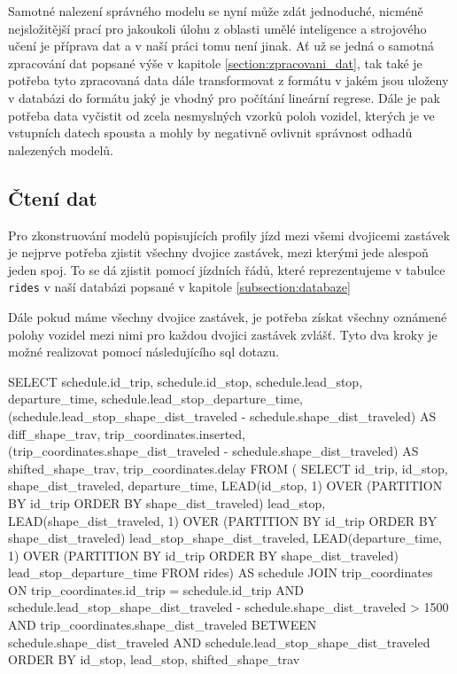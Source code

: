 Samotné nalezení správného modelu se nyní může zdát jednoduché, nicméně nejsložitější prací pro jakoukoli úlohu z oblasti umělé inteligence a strojového učení je příprava dat a v naší práci tomu není jinak. Ať už se jedná o samotná zpracování dat popsané výše v kapitole \ref{section:zpracovani_dat}, tak také je potřeba tyto zpracovaná data dále transformovat z formátu v jakém jsou uloženy v databázi do formátu jaký je vhodný pro počítání lineární regrese. Dále je pak potřeba data vyčistit od zcela nesmyslných vzorků poloh vozidel, kterých je ve vstupních datech spousta a mohly by negativně ovlivnit správnost odhadů nalezených modelů.


\subsection{Čtení dat} \label{subsection:cteni_dat}


Pro zkonstruování modelů popisujících profily jízd mezi všemi dvojicemi zastávek je nejprve potřeba zjistit všechny dvojice zastávek, mezi kterými jede alespoň jeden spoj. To se dá zjistit pomocí jízdních řádů, které reprezentujeme v tabulce \verb-rides- v naší databázi popsané v kapitole \ref{subsection:databaze}


\bigbreak


 Dále pokud máme všechny dvojice zastávek, je potřeba získat všechny oznámené polohy vozidel mezi nimi pro každou dvojici zastávek zvlášť. Tyto dva kroky je možné realizovat pomocí následujícího \gls{sql} dotazu.


\begin{code}[frame=none]
SELECT schedule.id_trip,
  schedule.id_stop,
  schedule.lead_stop,
  departure_time,
  schedule.lead_stop_departure_time,
  (schedule.lead_stop_shape_dist_traveled - schedule.shape_dist_traveled)
    AS diff_shape_trav,
  trip_coordinates.inserted,
  (trip_coordinates.shape_dist_traveled - schedule.shape_dist_traveled)
    AS shifted_shape_trav,
  trip_coordinates.delay
FROM (
  SELECT id_trip, id_stop, shape_dist_traveled, departure_time,
    LEAD(id_stop, 1) OVER (PARTITION BY
	  id_trip ORDER BY shape_dist_traveled) lead_stop,
    LEAD(shape_dist_traveled, 1) OVER (PARTITION BY
	  id_trip ORDER BY shape_dist_traveled) lead_stop_shape_dist_traveled,
    LEAD(departure_time, 1) OVER (PARTITION BY
	  id_trip ORDER BY shape_dist_traveled) lead_stop_departure_time
  FROM rides) AS schedule
JOIN trip_coordinates
ON trip_coordinates.id_trip = schedule.id_trip AND
  schedule.lead_stop_shape_dist_traveled -
    schedule.shape_dist_traveled > 1500 AND
  trip_coordinates.shape_dist_traveled
    BETWEEN schedule.shape_dist_traveled AND
  schedule.lead_stop_shape_dist_traveled
ORDER BY id_stop, lead_stop, shifted_shape_trav
\end{code}


